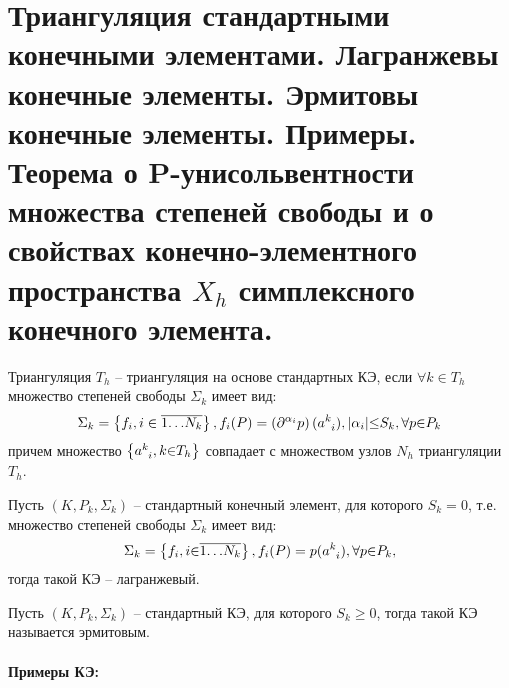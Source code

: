 \documentclass[__main__.tex]{subfiles}
\begin{document}
\section{Триангуляция стандартными конечными элементами. Лагранжевы конечные элементы. Эрмитовы конечные элементы. Примеры. Теорема о P-унисольвентности множества степеней свободы и о свойствах конечно-элементного пространства $X_h$ симплексного конечного элемента.}

\begin{definition}
	Триангуляция \(T_h\) -- триангуляция на основе стандартных КЭ, если \({\forall}k{\in}T_h\) множество степеней свободы \(\Sigma_k\) имеет вид:
	\begin{gather*}
		\Sigma_k=\left\{f_i,i\in\overline{1{\dots}N_k}\right\},
		f_i(P)=\left({\partial^{\alpha_i}p}\right)(a\indices{^k_i}),
		|\alpha_i|{\le}S_k,
		{\forall}p{\in}P_k
	\end{gather*}
	причем множество \(\left\{a\indices{^k_i},k{\in}T_h\right\}\) совпадает с множеством узлов \(N_h\) триангуляции \(T_h\).
\end{definition}

\begin{definition}
	Пусть \(\left(K,P_k,\Sigma_k\right)\) -- стандартный конечный элемент, для которого \(S_k=0\), т.е. множество степеней свободы \(\Sigma_k\) имеет вид:
	\begin{gather*}
		\Sigma_k=\left\{f_i,i{\in}\overline{1{\dots}N_k}\right\},
		f_i(P)=p(a\indices{^k_i}),
		{\forall}p{\in}P_k,
	\end{gather*}
	тогда такой КЭ -- лагранжевый.
\end{definition}

\begin{definition}
	Пусть \(\left(K,P_k,\Sigma_k\right)\) -- стандартный КЭ, для которого \(S_k{\ge}0\), тогда такой КЭ называется эрмитовым.
\end{definition}

\paragraph{Примеры КЭ:}
\end{document}
